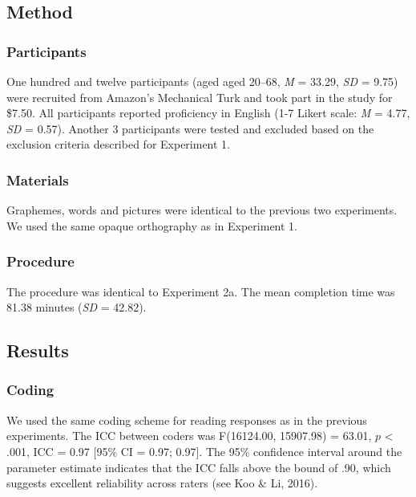 \documentclass[doc,floatsintext]{apa6}
\begin{document}
\subsection{Method}\label{method-2}

\subsubsection{Participants}\label{participants-2}

One hundred and twelve participants (aged aged 20--68, \emph{M} = 33.29,
\emph{SD} = 9.75) were recruited from Amazon's Mechanical Turk and took
part in the study for \$7.50. All participants reported proficiency in
English (1-7 Likert scale: \emph{M} = 4.77, \emph{SD} = 0.57). Another 3
participants were tested and excluded based on the exclusion criteria
described for Experiment 1.

\subsubsection{Materials}\label{materials-2}

Graphemes, words and pictures were identical to the previous two
experiments. We used the same opaque orthography as in Experiment 1.

\subsubsection{Procedure}\label{procedure-2}

The procedure was identical to Experiment 2a. The mean completion time
was 81.38 minutes (\emph{SD} = 42.82).

\subsection{Results}\label{results-2}

\subsubsection{Coding}\label{coding-2}

We used the same coding scheme for reading responses as in the previous
experiments. The ICC between coders was F(16124.00, 15907.98) = 63.01,
\(p\) \textless{} .001, ICC = 0.97 {[}95\% CI = 0.97; 0.97{]}. The 95\%
confidence interval around the parameter estimate indicates that the ICC
falls above the bound of .90, which suggests excellent reliability
across raters (see Koo \& Li, 2016).
\end{document}
